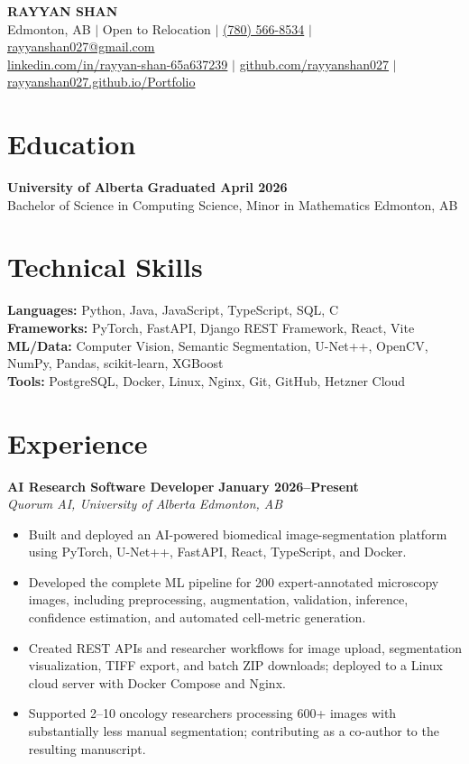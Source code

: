 \documentclass[10pt,letterpaper]{article}
\newcommand{\role}[4]{%
  \textbf{#1} \hfill \textbf{#2}\\[-1pt]
  \textit{#3} \hfill \textit{#4}\vspace{-2pt}
}
\begin{document}
\begin{center}
  {\LARGE\bfseries RAYYAN SHAN}\\[3pt]
  Edmonton, AB $\mid$ Open to Relocation $\mid$
  \href{tel:+17805668534}{(780) 566-8534} $\mid$
  \href{mailto:rayyanshan027@gmail.com}{rayyanshan027@gmail.com}\\[2pt]
  \href{https://linkedin.com/in/rayyan-shan-65a637239}{linkedin.com/in/rayyan-shan-65a637239} $\mid$
  \href{https://github.com/rayyanshan027}{github.com/rayyanshan027} $\mid$
  \href{https://rayyanshan027.github.io/Portfolio}{rayyanshan027.github.io/Portfolio}
\end{center}
\vspace{-7pt}

\section{Education}
\textbf{University of Alberta} \hfill \textbf{Graduated April 2026}\\[-1pt]
Bachelor of Science in Computing Science, Minor in Mathematics \hfill Edmonton, AB

\section{Technical Skills}
\textbf{Languages:} Python, Java, JavaScript, TypeScript, SQL, C\\
\textbf{Frameworks:} PyTorch, FastAPI, Django REST Framework, React, Vite\\
\textbf{ML/Data:} Computer Vision, Semantic Segmentation, U-Net++, OpenCV, NumPy, Pandas, scikit-learn, XGBoost\\
\textbf{Tools:} PostgreSQL, Docker, Linux, Nginx, Git, GitHub, Hetzner Cloud

\section{Experience}
\role{AI Research Software Developer}{January 2026--Present}{Quorum AI, University of Alberta}{Edmonton, AB}
\begin{itemize}
  \item Built and deployed an AI-powered biomedical image-segmentation platform using PyTorch, U-Net++, FastAPI, React, TypeScript, and Docker.
  \item Developed the complete ML pipeline for 200 expert-annotated microscopy images, including preprocessing, augmentation, validation, inference, confidence estimation, and automated cell-metric generation.
  \item Created REST APIs and researcher workflows for image upload, segmentation visualization, TIFF export, and batch ZIP downloads; deployed to a Linux cloud server with Docker Compose and Nginx.
  \item Supported 2--10 oncology researchers processing 600+ images with substantially less manual segmentation; contributing as a co-author to the resulting manuscript.
\end{itemize}
\end{document}
